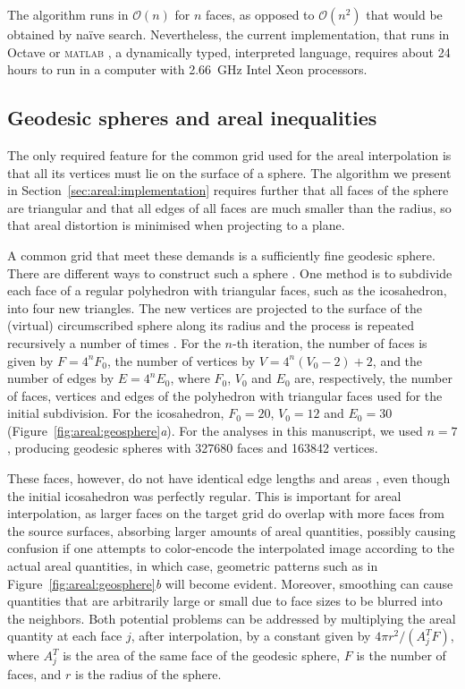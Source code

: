 The algorithm runs in $\mathcal{O}(n)$ for $n$ faces, as opposed to $\mathcal{O}(n^2)$ that would be obtained by na\"ive search. Nevertheless, the current implementation, that runs in Octave \citep{Eaton2015} or \textsc{matlab} \citep{MATLAB2015}, a dynamically typed, interpreted language, requires about 24 hours to run in a computer with 2.66~GHz Intel Xeon processors.


\subsection{Geodesic spheres and areal inequalities}
\label{sec:areal:geosphere}

The only required feature for the common grid used for the areal interpolation is that all its vertices must lie on the surface of a sphere. The algorithm we present in Section~\ref{sec:areal:implementation} requires further that all faces of the sphere are triangular and that all edges of all faces are much smaller than the radius, so that areal distortion is minimised when projecting to a plane.

A common grid that meet these demands is a sufficiently fine geodesic sphere. There are different ways to construct such a sphere \citep{Kenner1976}. One method is to subdivide each face of a regular polyhedron with triangular faces, such as the icosahedron, into four new triangles. The new vertices are projected to the surface of the (virtual) circumscribed sphere along its radius and the process is repeated recursively a number of times \citep{Lauchner1969}. For the $n$-th iteration, the number of faces is given by $F=4^nF_0$, the number of vertices by $V=4^n(V_0-2)+2$, and the number of edges by $E=4^nE_0$, where $F_0$, $V_0$ and $E_0$ are, respectively, the number of faces, vertices and edges of the polyhedron with triangular faces used for the initial subdivision. For the icosahedron, $F_0=20$, $V_0=12$ and $E_0=30$ (Figure~\ref{fig:areal:geosphere}\emph{a}). For the analyses in this manuscript, we used $n=7$, producing geodesic spheres with 327680 faces and 163842 vertices.

These faces, however, do not have identical edge lengths and areas \citep{Kenner1976}, even though the initial icosahedron was perfectly regular. This is important for areal interpolation, as larger faces on the target grid do overlap with more faces from the source surfaces, absorbing larger amounts of areal quantities, possibly causing confusion if one attempts to color-encode the interpolated image according to the actual areal quantities, in which case, geometric patterns such as in Figure~\ref{fig:areal:geosphere}\emph{b} will become evident. Moreover, smoothing can cause quantities that are arbitrarily large or small due to face sizes to be blurred into the neighbors. Both potential problems can be addressed by multiplying the areal quantity at each face $j$, after interpolation, by a constant given by $4 \pi r^2/(A^{T}_{j}F)$, where $A^{T}_{j}$ is the area of the same face of the geodesic sphere, $F$ is the number of faces, and $r$ is the radius of the sphere.

